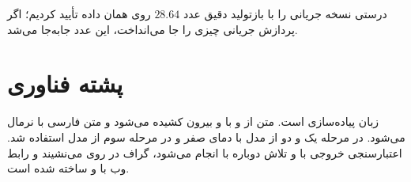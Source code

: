 درستی نسخه جریانی را با بازتولید دقیق عدد $28.64$ روی همان داده تأیید کردیم؛ اگر پردازش جریانی چیزی را جا می‌انداخت، این عدد جابه‌جا می‌شد.

\section{پشته فناوری}
\label{sec:stack}

زبان پیاده‌سازی  است. متن از  و  با  و  بیرون کشیده می‌شود و متن فارسی با  نرمال می‌شود. در مرحله یک و دو از مدل  با دمای صفر و در مرحله سوم از مدل  استفاده شد. اعتبارسنجی خروجی با  و تلاش دوباره با  انجام می‌شود، گراف در  روی  می‌نشیند و رابط وب با  و  ساخته شده است.
